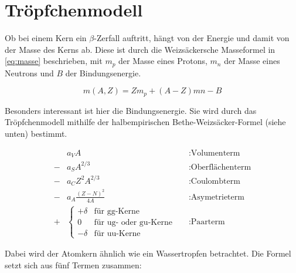 \section{Tröpfchenmodell}
Ob bei einem Kern ein $\beta$-Zerfall auftritt, hängt von der Energie und damit von der Masse des Kerns ab. Diese ist durch die Weizsäckersche Masseformel in \cref{eq:masse} beschrieben, mit $m_p$ der Masse eines Protons, $m_n$ der Masse eines Neutrons und $B$ der Bindungsenergie.

\begin{equation}
	m(A,Z) = Zm_p + (A-Z)mn-B
	\label{eq:masse}
\end{equation}

Besonders interessant ist hier die Bindungsenergie. Sie wird durch das Tröpfchenmodell mithilfe der halbempirischen Bethe-Weizsäcker-Formel (siehe unten) bestimmt.

\begin{align*}
	&a_V A  &&:\text{Volumenterm}\\
	-&a_S A^{2/3} &&:\text{Oberflächenterm}\\
	-&a_C Z^2 A^{2/3} &&:\text{Coulombterm}\\
	-&a_A \frac{(Z-N)^2}{4A} &&:\text{Asymetrieterm}\\
	+&\begin{cases}
		+\delta  &\text{für gg-Kerne}\\
		0 &\text{für ug- oder gu-Kerne} \\
		-\delta &\text{für uu-Kerne} 
	\end{cases}&&:\text{Paarterm}
\end{align*}

Dabei wird der Atomkern ähnlich wie ein Wassertropfen betrachtet. Die Formel setzt sich aus fünf Termen zusammen:

